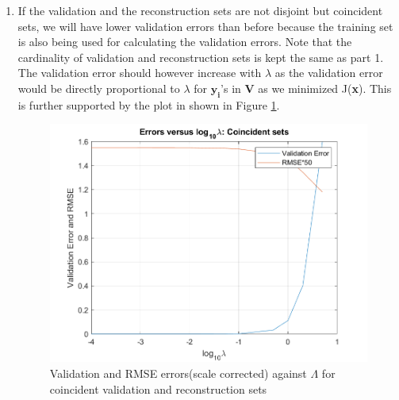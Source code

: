 \documentclass[11pt]{article}
\begin{document}
\begin{enumerate}
\begin{enumerate}
    \item If the validation and the reconstruction sets are not disjoint but coincident sets, we will have lower validation errors than before because the training set is also being used for calculating the validation errors. Note that the cardinality of validation and reconstruction sets is kept the same as part 1. The validation error should however increase with $\lambda$ as the validation error would be directly proportional to $\lambda$ for $\mathbf{y_i}$'s in \textbf{V} as we minimized J(\textbf{x}). This is further supported by the plot in shown in Figure \ref{fig:2}.
    \begin{figure}[h!]
        \centering
        \includegraphics[width=0.7\linewidth]{images/plot2.png}
        \caption{Validation and RMSE errors(scale corrected) against $\Lambda$ for coincident validation and reconstruction sets}
        \label{fig:2}
    \end{figure}
    

\end{enumerate}
\end{enumerate}
\end{document}
